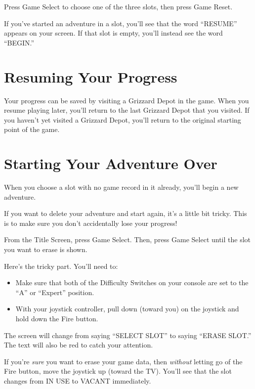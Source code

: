 \documentclass[12pt,twoside,openright,book]{memoir}
\begin{document}
Press  Game  Select  to  choose  one of  the  three  slots,  then  press
Game Reset.

If  you've started  an adventure  in a  slot, you'll  see that  the word
``RESUME'' appears on your screen. If that slot is empty, you'll instead
see the word ``BEGIN.''

\section{Resuming Your Progress}

Your progress  can be saved  by visiting a  Grizzard Depot in  the game.
When you resume playing later, you'll  return to the last Grizzard Depot
that you  visited. If you haven't  yet visited a Grizzard  Depot, you'll
return to the original starting point of the game.

\section{Starting Your Adventure Over}\label{Starting Your Adventure Over}

When you choose a slot with no game record in it already, you'll begin
a new adventure.

If you want to delete your adventure  and start again, it's a little bit
tricky. This is to make sure you don't accidentally lose your progress!

From the Title Screen, press Game  Select. Then, press Game Select until
the slot you want to erase is shown.

Here's the tricky part. You'll need to:

\begin{itemize}
\item Make sure that both of the Difficulty Switches on your console
  are set to the ``A'' or ``Expert'' position.
\item With your joystick controller, pull down (toward you) on the
  joystick and hold down the Fire button.
\end{itemize}

The screen will change from saying ``SELECT SLOT'' to saying ``ERASE
SLOT.'' The text will also be red to catch your attention.

If  you're  \emph{sure}   you  want  to  erase  your   game  data,  then
\emph{without}  letting go  of the  Fire  button, move  the joystick  up
(toward  the TV).  You'll  see that  the  slot changes  from  IN USE  to
VACANT immediately.
\end{document}
